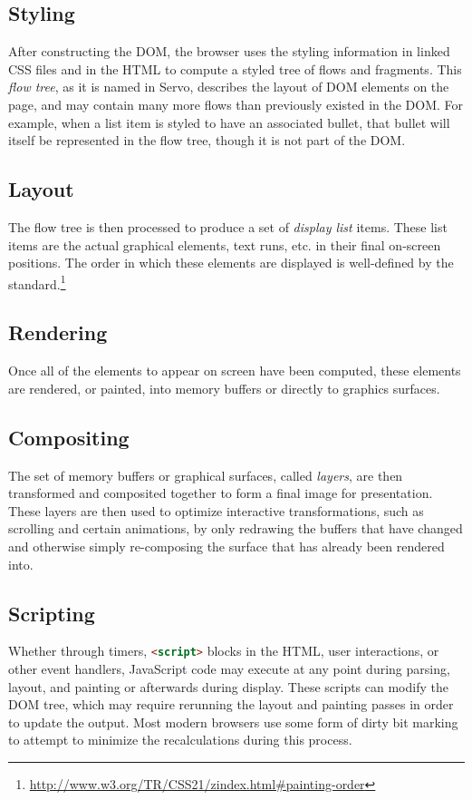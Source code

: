 \subsection{Styling}

After constructing the DOM, the browser uses the styling information in linked
CSS files and in the HTML to compute a styled tree of flows and fragments.
This \emph{flow tree}, as it is named in Servo, describes the layout of DOM elements on the page,
and may contain many more flows than previously existed in the DOM.
For example, when a list item is styled to have an associated bullet, that bullet
will itself be represented in the flow tree, though it is not part of the DOM.

\subsection{Layout}

The flow tree is then processed to produce a set of \emph{display list} items.
These list items are the actual graphical elements, text runs, etc. in their
final on-screen positions.
The order in which these elements are displayed is well-defined by the
standard.\footnote{\url{http://www.w3.org/TR/CSS21/zindex.html#painting-order}}

\subsection{Rendering}

Once all of the elements to appear on screen have been computed, these
elements are rendered, or painted, into memory buffers or directly to graphics
surfaces.

\subsection{Compositing}

The set of memory buffers or graphical surfaces, called \emph{layers}, are then
transformed and composited together to form a final image for
presentation.
These layers are then used to optimize interactive transformations, such as scrolling
and certain animations, by only redrawing the buffers that have changed and
otherwise simply re-composing the surface that has already been rendered into.

\subsection{Scripting}

Whether through timers, \lstinline[language=HTML]{<script>} blocks in the
HTML, user interactions, or other event handlers, JavaScript code may execute
at any point during parsing, layout, and painting or afterwards during
display.  These scripts can modify the DOM tree, which may require rerunning
the layout and painting passes in order to update the output.  Most modern
browsers use some form of dirty bit marking to attempt to minimize the
recalculations during this process.


